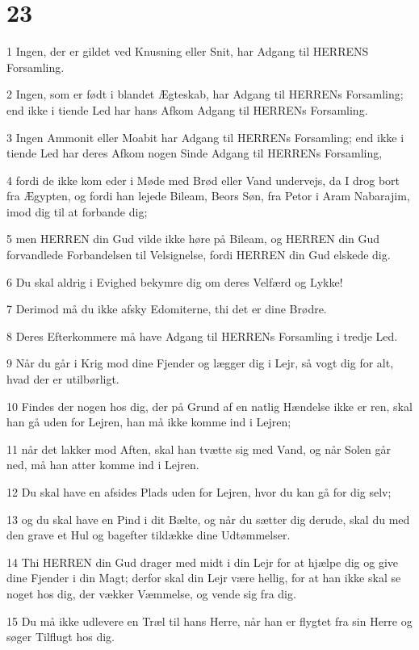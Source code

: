 \chapter{23}

\par 1 Ingen, der er gildet ved Knusning eller Snit, har Adgang til HERRENS Forsamling.
\par 2 Ingen, som er født i blandet Ægteskab, har Adgang til HERRENs Forsamling; end ikke i tiende Led har hans Afkom Adgang til HERRENs Forsamling.
\par 3 Ingen Ammonit eller Moabit har Adgang til HERRENs Forsamling; end ikke i tiende Led har deres Afkom nogen Sinde Adgang til HERRENs Forsamling,
\par 4 fordi de ikke kom eder i Møde med Brød eller Vand undervejs, da I drog bort fra Ægypten, og fordi han lejede Bileam, Beors Søn, fra Petor i Aram Nabarajim, imod dig til at forbande dig;
\par 5 men HERREN din Gud vilde ikke høre på Bileam, og HERREN din Gud forvandlede Forbandelsen til Velsignelse, fordi HERREN din Gud elskede dig.
\par 6 Du skal aldrig i Evighed bekymre dig om deres Velfærd og Lykke!
\par 7 Derimod må du ikke afsky Edomiterne, thi det er dine Brødre.
\par 8 Deres Efterkommere må have Adgang til HERRENs Forsamling i tredje Led.
\par 9 Når du går i Krig mod dine Fjender og lægger dig i Lejr, så vogt dig for alt, hvad der er utilbørligt.
\par 10 Findes der nogen hos dig, der på Grund af en natlig Hændelse ikke er ren, skal han gå uden for Lejren, han må ikke komme ind i Lejren;
\par 11 når det lakker mod Aften, skal han tvætte sig med Vand, og når Solen går ned, må han atter komme ind i Lejren.
\par 12 Du skal have en afsides Plads uden for Lejren, hvor du kan gå for dig selv;
\par 13 og du skal have en Pind i dit Bælte, og når du sætter dig derude, skal du med den grave et Hul og bagefter tildække dine Udtømmelser.
\par 14 Thi HERREN din Gud drager med midt i din Lejr for at hjælpe dig og give dine Fjender i din Magt; derfor skal din Lejr være hellig, for at han ikke skal se noget hos dig, der vækker Væmmelse, og vende sig fra dig.
\par 15 Du må ikke udlevere en Træl til hans Herre, når han er flygtet fra sin Herre og søger Tilflugt hos dig.
